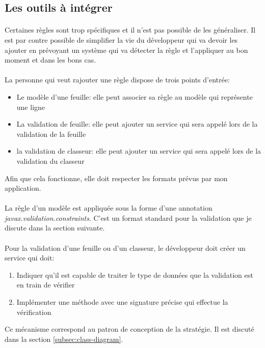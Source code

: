 \subsection{Les outils à intégrer}
\label{subsec:host-tools}

\paragraph{}
Certaines règles sont trop spécifiques et il n'est pas possible de les généraliser.
Il est par contre possible de simplifier la vie du développeur qui va devoir les ajouter en prévoyant un système qui va détecter la règle et l'appliquer au bon moment et dans les bons cas.

\paragraph{}
La personne qui veut rajouter une règle dispose de trois points d'entrée:
\begin{itemize}
    \item Le modèle d'une feuille: elle peut associer sa règle au modèle qui représente une ligne
    \item La validation de feuille: elle peut ajouter un service qui sera appelé lors de la validation de la feuille
    \item la validation de classeur: elle peut ajouter un service qui sera appelé lors de la validation du classeur
\end{itemize}
Afin que cela fonctionne, elle doit respecter les formats prévus par mon application.

\paragraph{}
La règle d'un modèle est appliquée sous la forme d'une annotation \textit{javax.validation.constraints}.
C'est un format standard pour la validation que je discute dans la section suivante.

\paragraph{}
Pour la validation d'une feuille ou d'un classeur, le développeur doit créer un service qui doit:
\begin{enumerate}
    \item Indiquer qu'il est capable de traiter le type de données que la validation est en train de vérifier
    \item Implémenter une méthode avec une signature précise qui effectue la vérification
\end{enumerate}
Ce mécanisme correspond au patron de conception de la stratégie.
Il est discuté dans la section \ref{subsec:class-diagram}.
